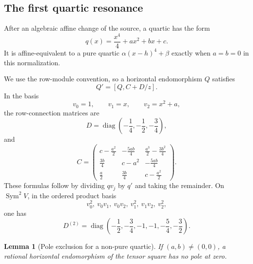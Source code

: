 \documentclass[11pt]{article}
\numberwithin{equation}{section}
\newtheorem{lemma}[lemma]{Lemma}
\theoremstyle{definition}
\theoremstyle{remark}
\newcommand{\Sym}{\operatorname{Sym}}
\begin{document}
\subsection{The first quartic resonance}

After an algebraic affine change of the source, a quartic has the form
\begin{equation}\label{eq:quartic}
  q(x)=\frac{x^4}{4}+ax^2+bx+c.
\end{equation}
It is affine-equivalent to a pure quartic
$\alpha(x-h)^4+\beta$ exactly when $a=b=0$ in this normalization.

We use the row-module convention, so a horizontal endomorphism $Q$ satisfies
\[
  Q'=[Q,C+D/z].
\]
In the basis
\[
  v_0=1,
  \qquad v_1=x,
  \qquad v_2=x^2+a,
\]
the row-connection matrices are
\begin{equation}\label{eq:quartic-CD}
  D=\operatorname{diag}\left(-\frac14,-\frac12,-\frac34\right),
\end{equation}
and
\[
  C=
  \begin{pmatrix}
  c-\frac{a^2}{2}&-\frac{5ab}{4}&\frac{a^3}{2}-\frac{3b^2}{4}\\[1mm]
  \frac{3b}{4}&c-a^2&-\frac{5ab}{4}\\[1mm]
  \frac a2&\frac{3b}{4}&c-\frac{a^2}{2}
  \end{pmatrix}.
\]
These formulas follow by dividing $qv_j$ by $q'$ and taking the remainder.
On $\Sym^2V$, in the ordered product basis
\[
  v_0^2,
  \ v_0v_1,
  \ v_0v_2,
  \ v_1^2,
  \ v_1v_2,
  \ v_2^2,
\]
one has
\begin{equation}\label{eq:quartic-D2}
  D^{(2)}=
  \operatorname{diag}\left(-\frac12,-\frac34,-1,-1,-\frac54,-\frac32\right).
\end{equation}

\begin{lemma}[Pole exclusion for a non-pure quartic]
\label{lem:quartic-pole}
If $(a,b)\ne(0,0)$, a rational horizontal endomorphism of the tensor square
has no pole at zero.
\end{lemma}
\end{document}
